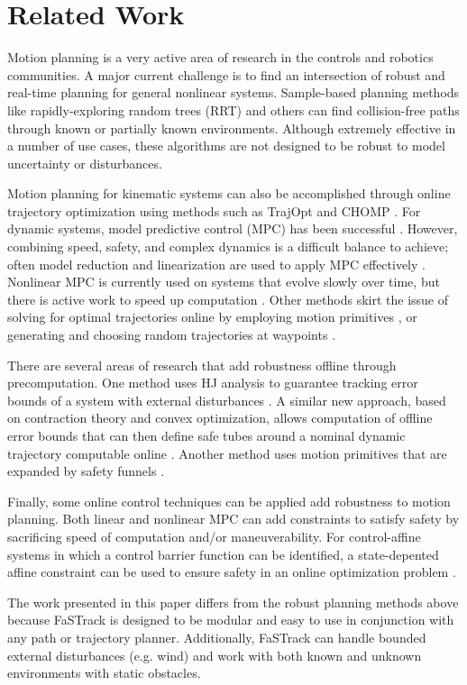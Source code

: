 \section{Related Work \label{sec:relatedwork}}
Motion planning is a very active area of research in the controls and robotics communities.  A major current challenge is to find an intersection of robust and real-time planning for general nonlinear systems. Sample-based planning methods like rapidly-exploring random trees (RRT) \cite{Kuffner2000} and others \cite{Kavraki1996,Janson2015,Richter2016, Karaman2011, Kobilarov2012} can find collision-free paths through known or partially known environments. Although extremely effective in a number of use cases, these algorithms are not designed to be robust to model uncertainty or disturbances.

Motion planning for kinematic systems can also be accomplished through online trajectory optimization using methods such as TrajOpt \cite{Schulman2013} and CHOMP \cite{Ratliff2009}. For dynamic systems, model predictive control (MPC) has been successful \cite{Qin2003}.  However, combining speed, safety, and complex dynamics is a difficult balance to achieve; often model reduction and linearization are used to apply MPC effectively \cite{Vitus2008, Zeilinger2011, Richter2012}.  Nonlinear MPC is currently used on systems that evolve slowly over time, but there is active work to speed up computation \cite{Diehl2002, Schildbach2016,Diehl2009, Neunert2016}. Other methods skirt the issue of solving for optimal trajectories online by employing motion primitives \cite{Gillula2010, Dey2016}, or generating and choosing random trajectories at waypoints \cite{Kalakrishnan2011, Schwesinger2013}. 

There are several areas of research that add robustness offline through precomputation.  One method uses HJ analysis to guarantee tracking error bounds of a system with external disturbances \cite{Bansal2017}. A similar new approach, based on contraction theory and convex optimization, allows computation of offline error bounds that can then define safe tubes around a nominal dynamic trajectory computable online \cite{Singh2017}.  Another method uses motion primitives that are expanded by safety funnels \cite{Majumdar2016}.

Finally, some online control techniques can be applied add robustness to motion planning. Both linear and nonlinear MPC can add constraints to satisfy safety \cite{Richards2006, DiCairano2016,Hoy2015} by sacrificing speed of computation and/or maneuverability. For control-affine systems in which a control barrier function can be identified, a state-depented affine constraint can be used to ensure safety in an online optimization problem \cite{Ames2014}.

The work presented in this paper differs from the robust planning methods above because FaSTrack is designed to be modular and easy to use in conjunction with any path or trajectory planner. Additionally, FaSTrack can handle bounded external disturbances (e.g. wind) and work with both known and unknown environments with static obstacles.